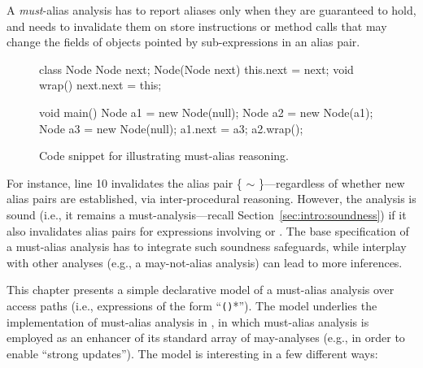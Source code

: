 A \emph{must}-alias analysis has to report aliases only when they are guaranteed to hold, and needs to invalidate them on store instructions or method calls that may change the fields of objects pointed by sub-expressions in an alias pair.

\begin{figure}[htb!p]
\begin{javacode}
class Node {
	Node next;
	Node(Node next) { this.next = next; }
	void wrap() { next.next = this; }
}

void main() {
	Node a1 = new Node(null);
	Node a2 = new Node(a1);
	Node a3 = new Node(null);
	a1.next = a3;
	a2.wrap();
}
\end{javacode}
\caption{Code snippet for illustrating must-alias reasoning.}
\label{fig:must-logic:snippet}
\end{figure}

For instance, line 10 invalidates the alias pair \{ $\sim$ \}---regardless of whether new alias pairs are established, via inter-procedural reasoning. However, the analysis is sound (i.e., it remains a must-analysis---recall Section~\ref{sec:intro:soundness}) if it also invalidates alias pairs for expressions involving  or . The base specification of a must-alias analysis has to integrate such soundness safeguards, while interplay with other analyses (e.g., a may-not-alias analysis) can lead to more inferences.

This chapter presents a simple declarative model of a must-alias analysis over access paths (i.e., expressions of the form ``\texttt{()}*''). The model underlies the implementation of must-alias analysis in \doop{}, in which must-alias analysis is employed as an enhancer of its standard array of may-analyses (e.g., in order to enable ``strong updates''). The model is interesting in a few different ways:

